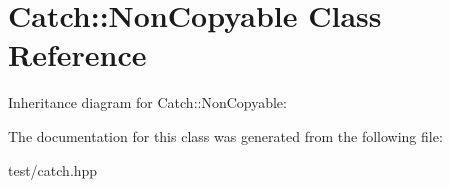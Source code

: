 \hypertarget{classCatch_1_1NonCopyable}{}\section{Catch\+:\+:Non\+Copyable Class Reference}
\label{classCatch_1_1NonCopyable}


Inheritance diagram for Catch\+:\+:Non\+Copyable\+:


The documentation for this class was generated from the following file\+:\begin{DoxyCompactItemize}
\item 
test/catch.\+hpp\end{DoxyCompactItemize}
